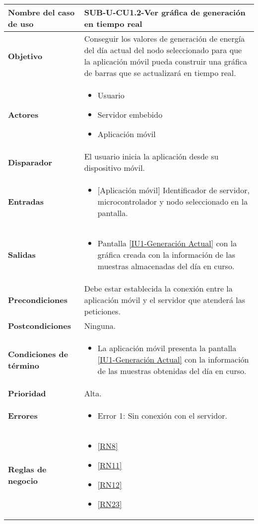 \begin{longtable}{|J{5cm}|J{10.3cm}|}
	\hline
	\textbf{Nombre del caso de uso} &
		SUB-U-CU1.2-Ver gráfica de generación en tiempo real \\ \hline
	\textbf{Objetivo} &
		Conseguir los valores de generación de energía del día actual del nodo seleccionado para que la aplicación móvil pueda construir una gráfica de barras que se actualizará en tiempo real. \\ \hline
	\textbf{Actores} &
		\begin{itemize}
		    \item Usuario
			\item Servidor embebido
			\item Aplicación móvil
		\end{itemize} \\ \hline
	\textbf{Disparador} & 
	    El usuario inicia la aplicación desde su dispositivo móvil.\\ \hline 
	\textbf{Entradas} & 
		\begin{itemize}
				\item{[Aplicación móvil]} Identificador de servidor, microcontrolador y nodo seleccionado en la pantalla.
		\end{itemize}\\ \hline 
	\textbf{Salidas} & 
		\begin{itemize}
			\item Pantalla \hyperref[fig:monitoreoReal]{[IU1-Generación Actual]} con la gráfica creada con la información de las muestras almacenadas del día en curso.
		\end{itemize} \\ \hline
	\textbf{Precondiciones} &
		Debe estar establecida la conexión entre la aplicación móvil y el servidor que atenderá las peticiones.
		\\ \hline
	\textbf{Postcondiciones} &
		Ninguna.\\ \hline
	\textbf{Condiciones de término} & 
		\begin{itemize}
			\item La aplicación móvil presenta la pantalla \hyperref[fig:monitoreoReal]{[IU1-Generación Actual]} con la información de las muestras obtenidas del día en curso.
		\end{itemize} \\ \hline 
	\textbf{Prioridad} & 
		Alta. \\ \hline
	\textbf{Errores} & 
		\begin{itemize}
		    \item \label{CUU1.2:Error1} Error 1: Sin conexión con el servidor.
		\end{itemize} \\ \hline
	\textbf{Reglas de negocio} & 
		\begin{itemize}
		    \item \ref{RN8}
			\item \ref{RN11}
			\item \ref{RN12}
			\item \ref{RN23}
		\end{itemize} \\ \hline
\end{longtable}

